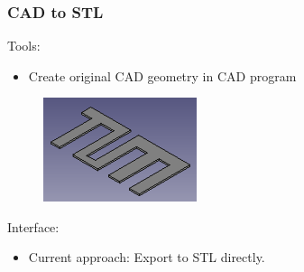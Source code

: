 
\begin{frame}
	\frametitle{CAD to STL}
	\begin{minipage}{0.85\textwidth}
	Tools:
		\begin{itemize}
		\item Create original CAD geometry in CAD program
		\end{itemize}
		\begin{figure}
		\includegraphics[width=0.4\textwidth]{Pictures/CAD/TUM.png}
		\end{figure}
		Interface:
		\begin{itemize}
		\item Current approach: Export to STL directly.
		\end{itemize}
	\begin{figure}
	\end{figure}
	\end{minipage}
	\begin{minipage}{0.14\textwidth}
		\begin{figure}
					\\

\end{figure}
\end{minipage}
\end{frame}
